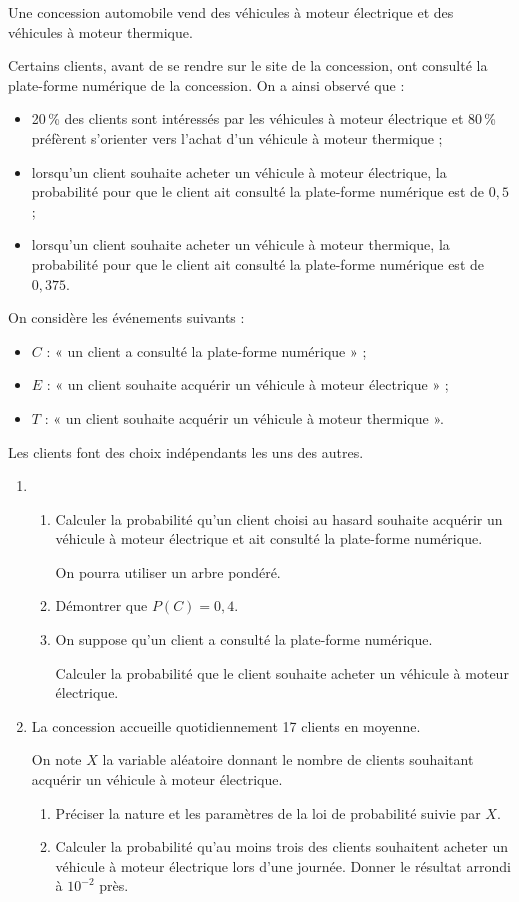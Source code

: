 Une concession automobile vend des véhicules à moteur électrique et des véhicules à moteur thermique.

Certains clients, avant de se rendre sur le site de la concession, ont consulté la plate-forme numérique de la concession. On a ainsi observé que :

\begin{itemize}
	\item 20\,\% des clients sont intéressés par les véhicules à moteur électrique et 80\,\% préfèrent s'orienter vers l'achat d'un véhicule à moteur thermique ;
	\item lorsqu'un client souhaite acheter un véhicule à moteur électrique, la probabilité pour que le client ait consulté la plate-forme numérique est de $0,5$ ;
	\item lorsqu'un client souhaite acheter un véhicule à moteur thermique, la probabilité pour que le client ait consulté la plate-forme numérique est de $0,375$.
\end{itemize}

On considère les événements suivants :

\begin{itemize}
	\item $C$ : « un client a consulté la plate-forme numérique » ;
	\item $E$ : « un client souhaite acquérir un véhicule à moteur électrique » ;
	\item $T$ : « un client souhaite acquérir un véhicule à moteur thermique ».
\end{itemize}

Les clients font des choix indépendants les uns des autres.

\begin{enumerate}
	\item 
	\begin{enumerate}
		\item Calculer la probabilité qu'un client choisi au hasard souhaite acquérir un véhicule à moteur électrique et ait consulté la plate-forme numérique.
		
		On pourra utiliser un arbre pondéré.
		\item Démontrer que $P(C)=0,4$.
		\item On suppose qu'un client a consulté la plate-forme numérique.
		
		Calculer la probabilité que le client souhaite acheter un véhicule à moteur électrique.
	\end{enumerate}
	\item La concession accueille quotidiennement 17 clients en moyenne.
	
	On note $X$ la variable aléatoire donnant le nombre de clients souhaitant acquérir
	un véhicule à moteur électrique.
	\begin{enumerate}
		\item Préciser la nature et les paramètres de la loi de probabilité suivie par $X$.
		\item Calculer la probabilité qu'au moins trois des clients souhaitent acheter un
		véhicule à moteur électrique lors d'une journée. Donner le résultat arrondi à $10^{-2}$ près.
	\end{enumerate}
\end{enumerate}
